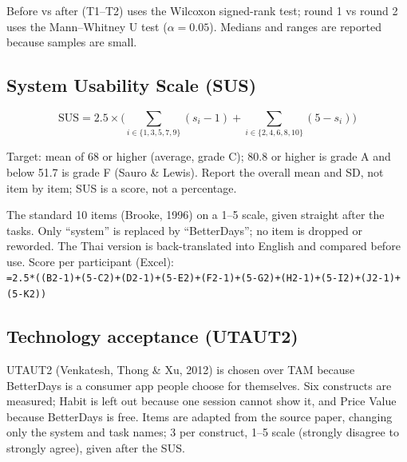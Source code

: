 \documentclass{article}
\begin{document}
Before vs after (T1--T2) uses the Wilcoxon signed-rank test; round 1 vs round 2 uses the Mann--Whitney U test ($\alpha = 0.05$). Medians and ranges are reported because samples are small.

\subsection{System Usability Scale (SUS)}

\[
\text{SUS} = 2.5 \times \Big( \sum_{i \in \{1,3,5,7,9\}} (s_i - 1) + \sum_{i \in \{2,4,6,8,10\}} (5 - s_i) \Big)
\]

Target: mean of 68 or higher (average, grade C); 80.8 or higher is grade A and below 51.7 is grade F (Sauro \& Lewis). Report the overall mean and SD, not item by item; SUS is a score, not a percentage.

The standard 10 items (Brooke, 1996) on a 1--5 scale, given straight after the tasks. Only ``system'' is replaced by ``BetterDays''; no item is dropped or reworded. The Thai version is back-translated into English and compared before use. Score per participant (Excel): \\
\texttt{=2.5*((B2-1)+(5-C2)+(D2-1)+(5-E2)+(F2-1)+(5-G2)+(H2-1)+(5-I2)+(J2-1)+(5-K2))}

\subsection{Technology acceptance (UTAUT2)}

UTAUT2 (Venkatesh, Thong \& Xu, 2012) is chosen over TAM because BetterDays is a consumer app people choose for themselves. Six constructs are measured; Habit is left out because one session cannot show it, and Price Value because BetterDays is free. Items are adapted from the source paper, changing only the system and task names; 3 per construct, 1--5 scale (strongly disagree to strongly agree), given after the SUS.
\end{document}
